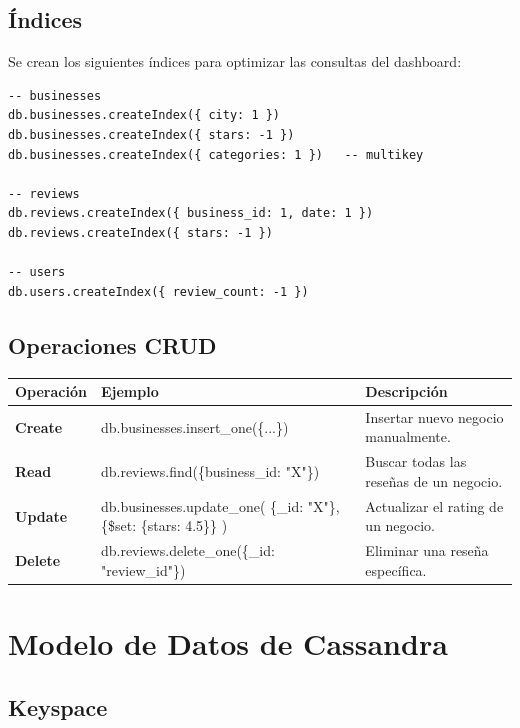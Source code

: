 \documentclass[12pt,a4paper]{article}
\begin{document}
\subsection{Índices}

Se crean los siguientes índices para optimizar las consultas del dashboard:

\begin{lstlisting}[language={}]
-- businesses
db.businesses.createIndex({ city: 1 })
db.businesses.createIndex({ stars: -1 })
db.businesses.createIndex({ categories: 1 })   -- multikey

-- reviews
db.reviews.createIndex({ business_id: 1, date: 1 })
db.reviews.createIndex({ stars: -1 })

-- users
db.users.createIndex({ review_count: -1 })
\end{lstlisting}

\subsection{Operaciones CRUD}

\begin{longtable}{>{\bfseries}p{2.5cm} >{\ttfamily\small\raggedright\arraybackslash}p{6.5cm} >{\raggedright\arraybackslash}p{5cm}}
\toprule
\normalfont\textbf{Operación} & \normalfont\textbf{Ejemplo} & \normalfont\textbf{Descripción} \\
\midrule
Create &
db.businesses.insert\_one(\{...\}) &
Insertar nuevo negocio manualmente. \\[0.3em]

Read &
db.reviews.find(\{business\_id: "X"\}) &
Buscar todas las reseñas de un negocio. \\[0.3em]

Update &
db.businesses.update\_one( \{\_id: "X"\}, \{\$set: \{stars: 4.5\}\} ) &
Actualizar el rating de un negocio. \\[0.3em]

Delete &
db.reviews.delete\_one(\{\_id: "review\_id"\}) &
Eliminar una reseña específica. \\
\bottomrule
\end{longtable}

\section{Modelo de Datos de Cassandra}

\subsection{Keyspace}
\end{document}
